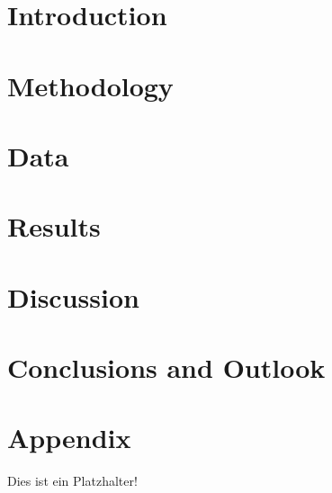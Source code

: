 \documentclass[12pt]{scrartcl}
\begin{document}


\pagebreak
{}
\tableofcontents

\pagebreak
{}
\pagestyle{fancy}
\renewcommand{\sectionmark}[1]{\markboth{\thesection. #1}{}}
\section{Introduction}


\section{Methodology}


\section{Data}


\section{Results}


\section{Discussion}


\section{Conclusions and Outlook}


\appendix
\section{Appendix}


\begin{thebibliography}{}
		Dies ist ein Platzhalter!
\end{thebibliography}
\end{document}
